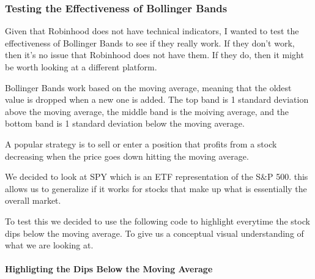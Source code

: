 \documentclass[]{article}
\let\oldparagraph\paragraph
\renewcommand{\paragraph}[1]{\oldparagraph{#1}\mbox{}}
\begin{document}
\hypertarget{testing-the-effectiveness-of-bollinger-bands}{%
\subsubsection{Testing the Effectiveness of Bollinger
Bands}\label{testing-the-effectiveness-of-bollinger-bands}}

Given that Robinhood does not have technical indicators, I wanted to
test the effectiveness of Bollinger Bands to see if they really work. If
they don't work, then it's no issue that Robinhood does not have them.
If they do, then it might be worth looking at a different platform.

Bollinger Bands work based on the moving average, meaning that the
oldest value is dropped when a new one is added. The top band is 1
standard deviation above the moving average, the middle band is the
moiving average, and the bottom band is 1 standard deviation below the
moving average.

A popular strategy is to sell or enter a position that profits from a
stock decreasing when the price goes down hitting the moving average.

We decided to look at SPY which is an ETF representation of the S\&P
500. this allows us to generalize if it works for stocks that make up
what is essentially the overall market.

To test this we decided to use the following code to highlight everytime
the stock dips below the moving average. To give us a conceptual visual
understanding of what we are looking at.

\hypertarget{highligting-the-dips-below-the-moving-average}{%
\paragraph{Highligting the Dips Below the Moving
Average}\label{highligting-the-dips-below-the-moving-average}}
\end{document}
